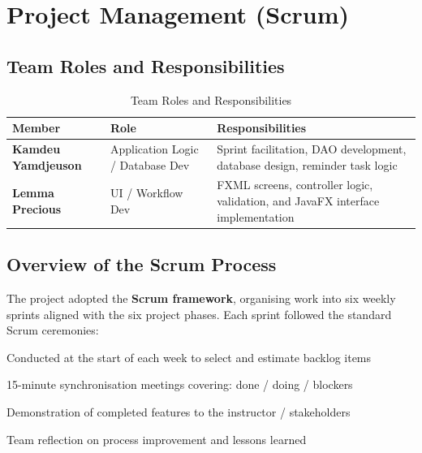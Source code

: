 \documentclass[12pt,a4paper]{report}
\newcommand{\rowE}{\rowcolor{White}}
\newcommand{\rowO}{\rowcolor{LightGray!60}}
\begin{document}
\chapter{Project Management (Scrum)}

\section{Team Roles and Responsibilities}

\begin{table}[H]
\centering
\caption{Team Roles and Responsibilities}
\begin{tabularx}{\textwidth}{>{\bfseries}l l X}
\toprule
\rowcolor{PrimaryBlue!15}
\textbf{Member} & \textbf{Role} & \textbf{Responsibilities} \\
\midrule
\rowO Kamdeu Yamdjeuson & Application Logic / Database Dev &
  Sprint facilitation, DAO development, database design, reminder task logic \\
\rowE Lemma Precious & UI / Workflow Dev &
  FXML screens, controller logic, validation, and JavaFX interface implementation \\
\bottomrule
\end{tabularx}
\end{table}

\section{Overview of the Scrum Process}

The project adopted the \textbf{Scrum framework}, organising work into six weekly sprints aligned with the six project phases. Each sprint followed the standard Scrum ceremonies:

\begin{tcolorbox}[warnbox, title={Scrum Ceremonies}]
\begin{description}[leftmargin=2cm, style=nextline]
  \item[Sprint Planning] Conducted at the start of each week to select and estimate backlog items
  \item[Daily Stand-ups] 15-minute synchronisation meetings covering: done / doing / blockers
  \item[Sprint Review] Demonstration of completed features to the instructor / stakeholders
  \item[Sprint Retrospective] Team reflection on process improvement and lessons learned
\end{description}
\end{tcolorbox}
\end{document}
